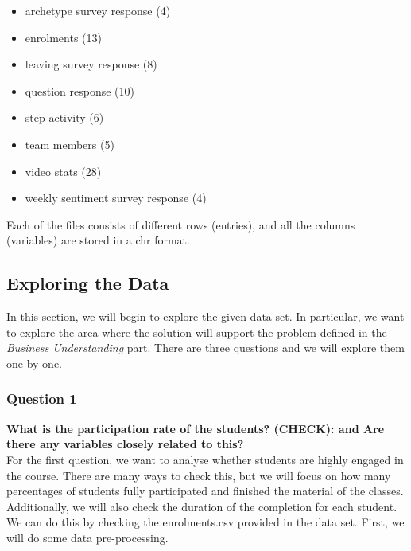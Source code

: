 \documentclass[12pt,]{article}
\providecommand{\tightlist}{%
\setlength{\itemsep}{0pt}\setlength{\parskip}{0pt}}
\begin{document}
\begin{itemize}
\tightlist
\item
  archetype survey response (4)
\item
  enrolments (13)
\item
  leaving survey response (8)
\item
  question response (10)
\item
  step activity (6)
\item
  team members (5)
\item
  video stats (28)
\item
  weekly sentiment survey response (4)
\end{itemize}

Each of the files consists of different rows (entries), and all the
columns (variables) are stored in a chr format.

\hypertarget{exploring-the-data}{%
\subsection{Exploring the Data}\label{exploring-the-data}}

In this section, we will begin to explore the given data set. In
particular, we want to explore the area where the solution will support
the problem defined in the \emph{Business Understanding} part. There are
three questions and we will explore them one by one.

\hypertarget{question-1}{%
\subsubsection{Question 1}\label{question-1}}

\textbf{What is the participation rate of the students? (CHECK): and Are
there any variables closely related to this?}\\
\hfill\break For the first question, we want to analyse whether students
are highly engaged in the course. There are many ways to check this, but
we will focus on how many percentages of students fully participated and
finished the material of the classes. Additionally, we will also check
the duration of the completion for each student. \hfill\break We can do
this by checking the enrolments.csv provided in the data set. First, we
will do some data pre-processing.
\end{document}
